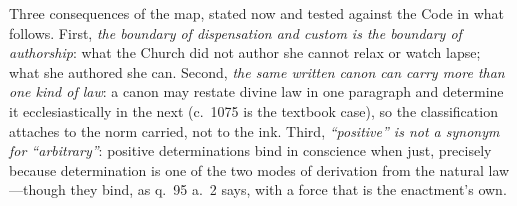 Three consequences of the map, stated now and tested against the Code in what follows. First, \emph{the boundary of dispensation and custom is the boundary of authorship}: what the Church did not author she cannot relax or watch lapse; what she authored she can. Second, \emph{the same written canon can carry more than one kind of law}: a canon may restate divine law in one paragraph and determine it ecclesiastically in the next (c.~1075 is the textbook case), so the classification attaches to the norm carried, not to the ink. Third, \emph{``positive'' is not a synonym for ``arbitrary''}: positive determinations bind in conscience when just, precisely because determination is one of the two modes of derivation from the natural law---though they bind, as q.~95 a.~2 says, with a force that is the enactment's own.
